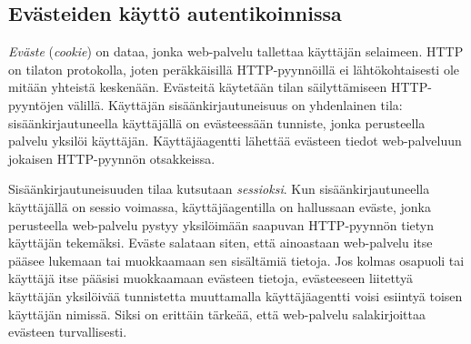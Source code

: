 \documentclass[finnish,gradu]{tktltiki}
\begin{document}


\subsection{Evästeiden käyttö autentikoinnissa} %
\label{ssub:keksien_käyttö_autentikoinnissa}

  \emph{Eväste} (\emph{cookie}) on dataa, jonka web-palvelu tallettaa käyttäjän selaimeen. HTTP on tilaton protokolla, joten peräkkäisillä HTTP-pyynnöillä ei lähtökohtaisesti ole mitään yhteistä keskenään. Evästeitä käytetään tilan säilyttämiseen HTTP-pyyntöjen välillä. Käyttäjän sisäänkirjautuneisuus on yhdenlainen tila: sisäänkirjautuneella käyttäjällä on evästeessään tunniste, jonka perusteella palvelu yksilöi käyttäjän. Käyttäjäagentti lähettää evästeen tiedot web-palveluun jokaisen HTTP-pyynnön otsakkeissa.

  Sisäänkirjautuneisuuden tilaa kutsutaan \emph{sessioksi}. Kun sisäänkirjautuneella käyttäjällä on sessio voimassa, käyttäjäagentilla on hallussaan eväste, jonka perusteella web-palvelu pystyy yksilöimään saapuvan HTTP-pyynnön tietyn käyttäjän tekemäksi. Eväste salataan siten, että ainoastaan web-palvelu itse pääsee lukemaan tai muokkaamaan sen sisältämiä tietoja. Jos kolmas osapuoli tai käyttäjä itse pääsisi muokkaamaan evästeen tietoja, evästeeseen liitettyä käyttäjän yksilöivää tunnistetta muuttamalla käyttäjäagentti voisi esiintyä toisen käyttäjän nimissä. Siksi on erittäin tärkeää, että web-palvelu salakirjoittaa evästeen turvallisesti.
\end{document}
